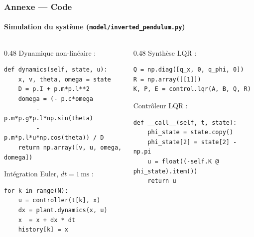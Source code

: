 \begin{frame}[fragile]
\frametitle{Annexe — Code}
\framesubtitle{Simulation du système (\texttt{model/inverted\_pendulum.py})}

\begin{columns}[T]
  \begin{column}{0.48\textwidth}
    Dynamique non-linéaire :
\begin{lstlisting}[style=python]
def dynamics(self, state, u):
    x, v, theta, omega = state
    D = p.I + p.m*p.l**2
    domega = (- p.c*omega
         - p.m*p.g*p.l*np.sin(theta)
         - p.m*p.l*u*np.cos(theta)) / D
    return np.array([v, u, omega, domega])
\end{lstlisting}
    Intégration Euler, $dt = 1\,\text{ms}$ :
\begin{lstlisting}[style=python]
for k in range(N):
    u = controller(t[k], x)
    dx = plant.dynamics(x, u)
    x  = x + dx * dt
    history[k] = x
\end{lstlisting}
  \end{column}
  \begin{column}{0.48\textwidth}
    Synthèse LQR :
\begin{lstlisting}[style=python]
Q = np.diag([q_x, 0, q_phi, 0])
R = np.array([[1]])
K, P, E = control.lqr(A, B, Q, R)
\end{lstlisting}
    \vspace{0.2cm}
    Contrôleur LQR :
\begin{lstlisting}[style=python]
def __call__(self, t, state):
    phi_state = state.copy()
    phi_state[2] = state[2] - np.pi
    u = float((-self.K @ phi_state).item())
    return u
\end{lstlisting}
  \end{column}
\end{columns}

\end{frame}



